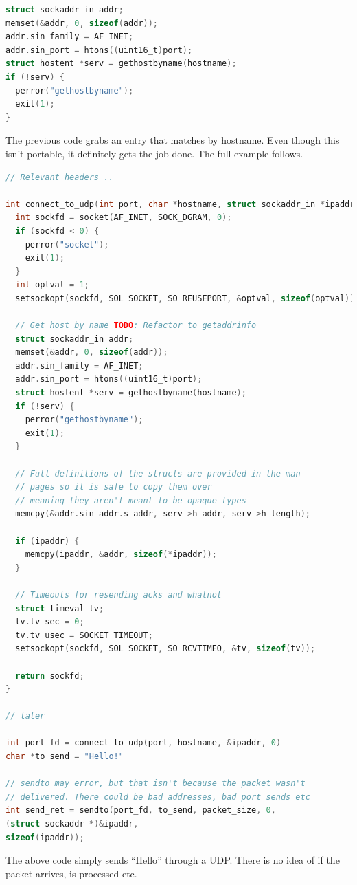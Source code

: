 \begin{lstlisting}[language=C]
struct sockaddr_in addr;
memset(&addr, 0, sizeof(addr));
addr.sin_family = AF_INET;
addr.sin_port = htons((uint16_t)port);
struct hostent *serv = gethostbyname(hostname);
if (!serv) {
  perror("gethostbyname");
  exit(1);
}
\end{lstlisting}

The previous code grabs an entry  that matches by hostname.
Even though this isn't portable, it definitely gets the job done.
The full example follows.

\begin{lstlisting}[language=C]
// Relevant headers ..

int connect_to_udp(int port, char *hostname, struct sockaddr_in *ipaddr) {
  int sockfd = socket(AF_INET, SOCK_DGRAM, 0);
  if (sockfd < 0) {
    perror("socket");
    exit(1);
  }
  int optval = 1;
  setsockopt(sockfd, SOL_SOCKET, SO_REUSEPORT, &optval, sizeof(optval));

  // Get host by name TODO: Refactor to getaddrinfo
  struct sockaddr_in addr;
  memset(&addr, 0, sizeof(addr));
  addr.sin_family = AF_INET;
  addr.sin_port = htons((uint16_t)port);
  struct hostent *serv = gethostbyname(hostname);
  if (!serv) {
    perror("gethostbyname");
    exit(1);
  }

  // Full definitions of the structs are provided in the man
  // pages so it is safe to copy them over
  // meaning they aren't meant to be opaque types
  memcpy(&addr.sin_addr.s_addr, serv->h_addr, serv->h_length);

  if (ipaddr) {
    memcpy(ipaddr, &addr, sizeof(*ipaddr));
  }

  // Timeouts for resending acks and whatnot
  struct timeval tv;
  tv.tv_sec = 0;
  tv.tv_usec = SOCKET_TIMEOUT;
  setsockopt(sockfd, SOL_SOCKET, SO_RCVTIMEO, &tv, sizeof(tv));

  return sockfd;
}

// later

int port_fd = connect_to_udp(port, hostname, &ipaddr, 0)
char *to_send = "Hello!"

// sendto may error, but that isn't because the packet wasn't
// delivered. There could be bad addresses, bad port sends etc
int send_ret = sendto(port_fd, to_send, packet_size, 0,
(struct sockaddr *)&ipaddr,
sizeof(ipaddr));
\end{lstlisting}

The above code simply sends ``Hello'' through a UDP. There is no idea of if the packet arrives, is processed etc.

